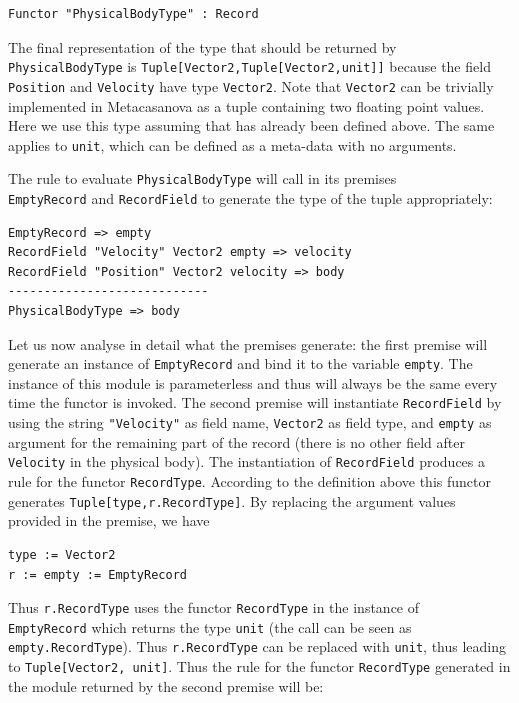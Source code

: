 \begin{lstlisting}
Functor "PhysicalBodyType" : Record
\end{lstlisting}

The final representation of the type that should be returned by\\ \texttt{PhysicalBodyType} is \texttt{Tuple[Vector2,Tuple[Vector2,unit]]} because the field \texttt{Position} and \texttt{Velocity} have type \texttt{Vector2}. Note that \texttt{Vector2} can be trivially implemented in Metacasanova as a tuple containing two floating point values. Here we use this type assuming that has already been defined above. The same applies to \texttt{unit}, which can be defined as a meta-data with no arguments.

The rule to evaluate \texttt{PhysicalBodyType} will call in its premises\\ \texttt{EmptyRecord} and \texttt{RecordField} to generate the type of the tuple appropriately:

\begin{lstlisting}
EmptyRecord => empty
RecordField "Velocity" Vector2 empty => velocity
RecordField "Position" Vector2 velocity => body
----------------------------
PhysicalBodyType => body
\end{lstlisting}

Let us now analyse in detail what the premises generate: the first premise will generate an instance of \texttt{EmptyRecord} and bind it to the variable \texttt{empty}. The instance of this module is parameterless and thus will always be the same every time the functor is invoked. The second premise will instantiate \texttt{RecordField} by using the string \texttt{"Velocity"} as field name, \texttt{Vector2} as field type, and \texttt{empty} as argument for the remaining part of the record (there is no other field after \texttt{Velocity} in the physical body). The instantiation of \texttt{RecordField} produces a rule for the functor \texttt{RecordType}. According to the definition above this functor generates \texttt{Tuple[type,r.RecordType]}. By replacing the argument values provided in the premise, we have 

\begin{lstlisting}
type := Vector2
r := empty := EmptyRecord
\end{lstlisting}

\noindent
Thus \texttt{r.RecordType} uses the functor \texttt{RecordType} in the instance of\\ \texttt{EmptyRecord} which returns the type \texttt{unit} (the call can be seen as\\ \texttt{empty.RecordType}). Thus \texttt{r.RecordType} can be replaced with \texttt{unit}, thus leading to \texttt{Tuple[Vector2, unit]}. Thus the rule for the functor \texttt{RecordType} generated in the module returned by the second premise will be:

